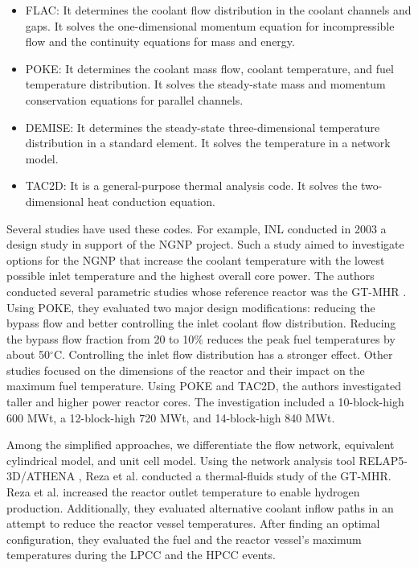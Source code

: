 \begin{itemize}
\item FLAC: It determines the coolant flow distribution in the coolant channels and gaps.
It solves the one-dimensional momentum equation for incompressible flow and the continuity equations for mass and energy.

\item POKE: It determines the coolant mass flow, coolant temperature, and fuel temperature distribution.
It solves the steady-state mass and momentum conservation equations for parallel channels.

\item DEMISE: It determines the steady-state three-dimensional temperature distribution in a standard element.
It solves the temperature in a network model.

\item TAC2D: It is a general-purpose thermal analysis code.
It solves the two-dimensional heat conduction equation.
\end{itemize}

Several studies have used these codes.
For example, \gls{INL} conducted in 2003 a design study \cite{macdonald_ngnp_2003} in support of the \gls{NGNP} project.
Such a study aimed to investigate options for the NGNP that increase the coolant temperature with the lowest possible inlet temperature and the highest overall core power.
The authors conducted several parametric studies whose reference reactor was the GT-MHR \cite{general_atomics_gas_1996}.
Using POKE, they evaluated two major design modifications: reducing the bypass flow and better controlling the inlet coolant flow distribution.
Reducing the bypass flow fraction from 20 to 10$\%$ reduces the peak fuel temperatures by about 50$^{\circ}$C.
Controlling the inlet flow distribution has a stronger effect.
Other studies focused on the dimensions of the reactor and their impact on the maximum fuel temperature.
Using POKE and TAC2D, the authors investigated taller and higher power reactor cores.
The investigation included a 10-block-high 600 MWt, a 12-block-high 720 MWt, and 14-block-high 840 MWt.

Among the simplified approaches, we differentiate the flow network, equivalent cylindrical model, and unit cell model.
Using the network analysis tool RELAP5-3D/ATHENA \cite{inl_relap5-3dathena_2005}, Reza et al. \cite{reza_design_2006} conducted a thermal-fluids study of the GT-MHR.
Reza et al. increased the reactor outlet temperature to enable hydrogen production.
Additionally, they evaluated alternative coolant inflow paths in an attempt to reduce the reactor vessel temperatures.
After finding an optimal configuration, they evaluated the fuel and the reactor vessel's maximum temperatures during the \gls{LPCC} and the \gls{HPCC} events.

